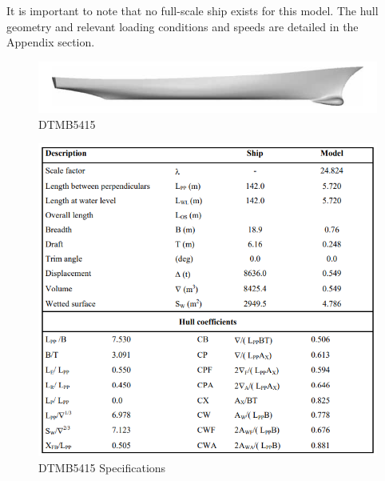 \documentclass[12pt]{article} %
\begin{document}
It is important to note that no full-scale ship exists for this model. The hull geometry and relevant loading conditions and speeds are detailed in the Appendix section.
\begin{figure}[ht]
    \centering
    \includegraphics[width=1\textwidth]{DTMB.png}
    \caption{DTMB5415}
\end{figure}
\begin{figure}[ht]
    \centering
    \includegraphics[width=1\textwidth]{DTMBsp.png}
    \caption{DTMB5415 Specifications}
\end{figure}
\clearpage
\end{document}
